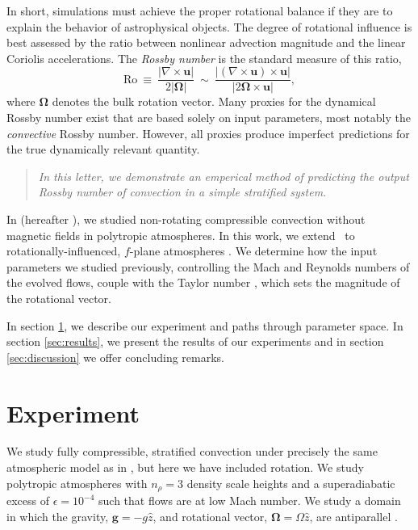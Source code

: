 \documentclass[twocolumn, amsmath, amsfonts, amssymb]{aastex62}
\begin{document}
In short, simulations must achieve the proper rotational balance if they are to explain 
the behavior of astrophysical objects. 
The degree of rotational influence is best assessed by the ratio between 
nonlinear advection magnitude and the linear Coriolis accelerations. 
The \textit{Rossby number} is the standard measure of this ratio, 
\begin{equation}
\text{Ro} \ \equiv \ \frac{| \nabla \times \boldsymbol{u} | }{2 |\bm{\Omega}|} \ 
\sim \ \frac{| (\nabla \times \boldsymbol{u}) \times \boldsymbol{u}  | }{|2 \bm{\Omega} \times \boldsymbol{u}|},
\label{eqn:rossby-def}
\end{equation}
where $\bm{\Omega}$ denotes the bulk rotation vector. 
Many proxies for the dynamical Rossby number exist that are based solely on input parameters, most notably the \textit{convective} Rossby number. 
However, all proxies produce imperfect predictions for the true dynamically relevant quantity.
\begin{quote}
\emph{In this letter, we demonstrate an emperical method of predicting the output Rossby number
of convection in a simple stratified system.}
\end{quote}
In \cite{anders&brown2017} (hereafter \AB), we studied non-rotating compressible convection without magnetic fields in polytropic atmospheres. 
In this work, we extend \AB$\,$ to rotationally-influenced, $f$-plane
atmospheres 
\cite[e.g.][]{brummell&all1996, brummell&all1998, calkins&all2015a}. 
We determine how the input parameters we studied previously, controlling the Mach and
Reynolds numbers of the evolved flows, couple with the Taylor number \citep[Ta, ][]{julien&all1996}, which sets the magnitude of the rotational vector. 

In section  \ref{sec:experiment}, we describe our experiment and paths through parameter space. 
In section \ref{sec:results}, we present the results of our experiments and in section \ref{sec:discussion} we offer concluding remarks.

\section{Experiment} 
\label{sec:experiment}
We study fully compressible, stratified 
convection under precisely the same atmospheric model
as in \AB, but here
we have included rotation. We study polytropic atmospheres
with $n_\rho = 3$ density scale heights and a superadiabatic
excess of $\epsilon = 10^{-4}$ such that flows are at low Mach number.
We study a domain in which the
gravity, $\bm{g} = -g\hat{z}$, and rotational vector, $\bm{\Omega} = \Omega \hat{z}$, 
are antiparallel \citep[as in e.g.,][]{julien&all1996, brummell&all1996}.
\end{document}
